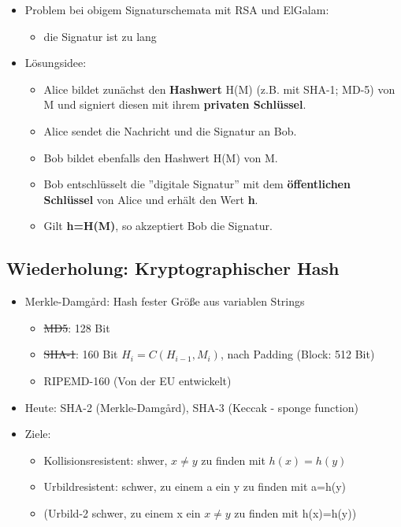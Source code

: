 \documentclass[openany]{book}
\begin{document}
\begin{itemize}
    \item Problem bei obigem Signaturschemata mit RSA und ElGalam:
    \begin{itemize}
        \item die Signatur ist zu lang
    \end{itemize}
    \item Lösungsidee:
    \begin{itemize}
        \item Alice bildet zunächst den \textbf{Hashwert} H(M) (z.B. mit SHA-1; MD-5) von M und signiert diesen mit ihrem \textbf{privaten Schlüssel}.
        \item Alice sendet die Nachricht und die Signatur an Bob.
        \item Bob bildet ebenfalls den Hashwert H(M) von M.
        \item Bob entschlüsselt die ''digitale Signatur'' mit dem \textbf{öffentlichen Schlüssel} von Alice und erhält den Wert \textbf{h}.
        \item Gilt \textbf{h=H(M)}, so akzeptiert Bob die Signatur.
    \end{itemize}
\end{itemize}

\subsection{Wiederholung: Kryptographischer Hash}

\begin{itemize}
    \item Merkle-Damgård: Hash fester Größe aus variablen Strings
    \begin{itemize}
        \item \sout{MD5}: 128 Bit
        \item \sout{SHA-1}: 160 Bit $H_i=C(H_{i-1},M_i)$, nach Padding (Block: 512 Bit)
        \item RIPEMD-160 (Von der EU entwickelt)
    \end{itemize}
    \item Heute: SHA-2 (Merkle-Damgård), SHA-3 (Keccak - sponge function) 
    \item Ziele:
    \begin{itemize}
        \item Kollisionsresistent: shwer, $x\neq y$ zu finden mit $h(x)=h(y)$
        \item Urbildresistent: schwer, zu einem a ein y zu finden mit a=h(y)
        \item (Urbild-2 schwer, zu einem x ein $x\neq y$ zu finden mit h(x)=h(y))
    \end{itemize}
\end{itemize}
\end{document}
